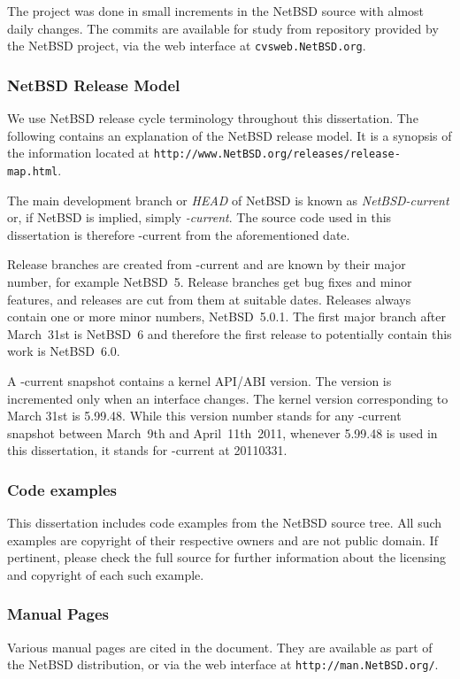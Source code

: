 The project was done in small increments in the NetBSD source with
almost daily changes.  The commits are available for study from
repository provided by the NetBSD project, \eg via the web interface
at \texttt{cvsweb.NetBSD.org}.

\subsubsection*{NetBSD Release Model}

We use NetBSD release cycle terminology throughout this dissertation.
The following contains an explanation of the NetBSD release model.
It is a synopsis of the information located at
\texttt{http://www.NetBSD.org/releases/release-map.html}.

The main development branch or \textit{HEAD} of NetBSD is known as
\textit{NetBSD-current} or, if NetBSD is implied, simply
\textit{-current}.  The source code used in this dissertation is
therefore -current from the aforementioned date.

Release branches are created from -current and are known by their
major number, for example NetBSD~5.  Release branches get bug fixes
and minor features, and releases are cut from them at suitable
dates.  Releases always contain one or more minor numbers, \eg
NetBSD~5.0.1.  The first major branch after March~31st is NetBSD~6
and therefore the first release to potentially contain this work
is NetBSD~6.0.

A -current snapshot contains a kernel API/ABI version.  The version is
incremented only when an interface changes.  The kernel version
corresponding to March 31st is 5.99.48.  While this version number
stands for any -current snapshot between March~9th and April~11th~2011,
whenever 5.99.48 is used in this dissertation, it stands for -current
at 20110331.

\subsubsection*{Code examples}

This dissertation includes code examples from the NetBSD source
tree.  All such examples are copyright of their respective owners
and are not public domain.  If pertinent, please check the full
source for further information about the licensing and copyright
of each such example.

\subsubsection{Manual Pages}

Various manual pages are cited in the document.  They are available
as part of the NetBSD distribution, or via the web interface
at \texttt{http://man.NetBSD.org/}.
